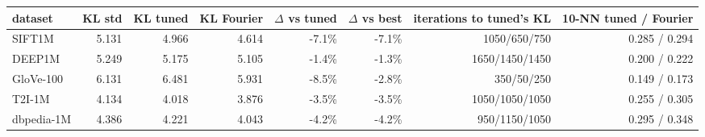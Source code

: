 \begin{tabular}{lrrrrrrr}\toprule
dataset & KL std & KL tuned & KL Fourier & $\Delta$ vs tuned & $\Delta$ vs best & iterations to tuned's KL & 10-NN tuned / Fourier\\\midrule
SIFT1M & 5.131 & 4.966 & 4.614 & -7.1\% & -7.1\% & 1050/650/750 & 0.285 / 0.294\\
DEEP1M & 5.249 & 5.175 & 5.105 & -1.4\% & -1.3\% & 1650/1450/1450 & 0.200 / 0.222\\
GloVe-100 & 6.131 & 6.481 & 5.931 & -8.5\% & -2.8\% & 350/50/250 & 0.149 / 0.173\\
T2I-1M & 4.134 & 4.018 & 3.876 & -3.5\% & -3.5\% & 1050/1050/1050 & 0.255 / 0.305\\
dbpedia-1M & 4.386 & 4.221 & 4.043 & -4.2\% & -4.2\% & 950/1150/1050 & 0.295 / 0.348\\
\bottomrule\end{tabular}
